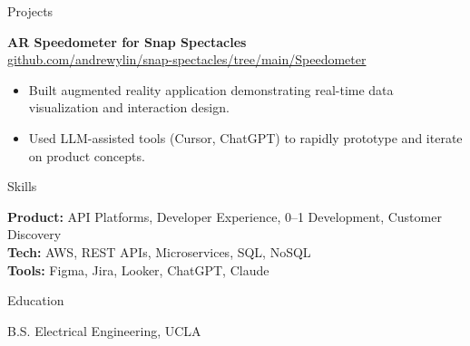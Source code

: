 \documentclass{resume}
\begin{document}
\begin{rSection}{Projects}

\textbf{AR Speedometer for Snap Spectacles} \\
\href{https://github.com/andrewylin/snap-spectacles/tree/main/Speedometer}{github.com/andrewylin/snap-spectacles/tree/main/Speedometer}
\begin{itemize}
\itemsep -3pt
\item Built augmented reality application demonstrating real-time data visualization and interaction design.
\item Used LLM-assisted tools (Cursor, ChatGPT) to rapidly prototype and iterate on product concepts.
\end{itemize}

\end{rSection}

\begin{rSection}{Skills}

\textbf{Product:} API Platforms, Developer Experience, 0–1 Development, Customer Discovery \\
\textbf{Tech:} AWS, REST APIs, Microservices, SQL, NoSQL \\
\textbf{Tools:} Figma, Jira, Looker, ChatGPT, Claude

\end{rSection}

\begin{rSection}{Education}

B.S. Electrical Engineering, UCLA

\end{rSection}
\end{document}
